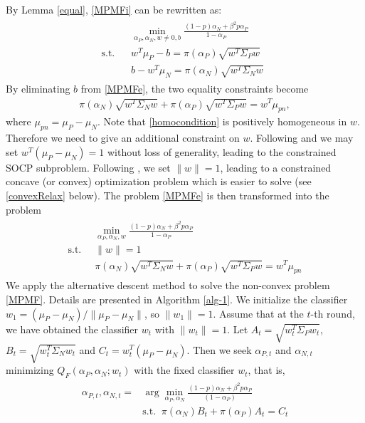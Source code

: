 \documentclass[15pt]{article}
\begin{document}
By Lemma \ref{equal}, \eqref{MPMFi} can be rewritten as:
\begin{align}\label{MPMFe}
\begin{split}
&\min_{\alpha_P,\alpha_N,w\neq 0,b}\frac{(1-p)\alpha_N+\beta^2p\alpha_P}{1-\alpha_P}\qquad \\
\text{s.t.}\;\;\; & w^T\mu_P-b=\pi(\alpha_P)\sqrt{w^T\Sigma_P w}\\
& b-w^T\mu_N=\pi(\alpha_N)\sqrt{w^T\Sigma_N w}
\end{split}
\end{align}
By eliminating $b$ from \eqref{MPMFe}, the two equality constraints become
\begin{align}\label{homocondition}
\pi(\alpha_N)\sqrt{w^T\Sigma_N w}+\pi(\alpha_P)\sqrt{w^T\Sigma_P w}=w^T \mu_{pn},
\end{align}
where $\mu_{pn}=\mu_P-\mu_N$. Note that \eqref{homocondition} is positively homogeneous in $w$.
Therefore we need to give an additional constraint on $w$.
Following \cite{Lanckriet2002} and \cite{Huang2004} we may set $w^T(\mu_P-\mu_N)=1$ without loss of generality, 
leading to the constrained SOCP subproblem.
Following \cite{Cousins2017}, we set $\|w\|=1$, leading to a constrained concave (or convex) optimization
problem which is easier to solve (see \eqref{convexRelax} below).
The problem \eqref{MPMFe} is then transformed into the problem
\begin{align}\label{MPMF}
\begin{split}
&\min_{\alpha_P,\alpha_N,w}\frac{(1-p)\alpha_N+\beta^2p\alpha_P}{1-\alpha_P}\\
\text{s.t.}\;\; &\|w\|=1\\
&\pi(\alpha_N)\sqrt{w^T\Sigma_N w}+\pi(\alpha_P)\sqrt{w^T\Sigma_P w}=w^T\mu_{pn} %
\end{split}
\end{align}
We apply the alternative descent method to solve the non-convex problem \eqref{MPMF}.
Details are presented in Algorithm \ref{alg-1}.
We initialize the classifier $w_1=({\mu_P-\mu_N})/{\|\mu_P-\mu_N\|}$, so $\|w_1\|=1$.
Assume that at the $t$-th round, we have obtained the classifier $w_t$ with $\|w_t\|=1.$
Let $A_t=\sqrt{w_t^T\Sigma_P w_t}$, $B_t=\sqrt{w_t^T\Sigma_N w_t}$ and $C_t=w_t^T(\mu_P-\mu_N)$.
Then we seek $\alpha_{P,t}$ and $\alpha_{N,t}$ minimizing $Q_F(\alpha_P,\alpha_N;w_t)$
with the fixed classifier $w_t$, that is,
\begin{align}\label{sub-1}
\begin{split}
\alpha_{P,t},\alpha_{N,t}= &\arg\min_{\alpha_P,\alpha_N}\frac{(1-p)\alpha_N+\beta^2p\alpha_P}{(1-\alpha_P)}\\
&\text{s.t.}\;\;\pi(\alpha_N)B_t+\pi(\alpha_P)A_t=C_t %
\end{split}
\end{align}
\end{document}

